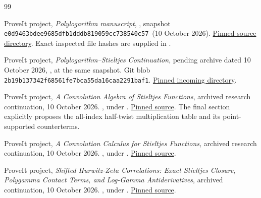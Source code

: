 \documentclass[11pt,letterpaper]{article}
\numberwithin{equation}{section}
\theoremstyle{plain}
\theoremstyle{definition}
\theoremstyle{remark}
\newcommand{\pinned}{\texttt{e0d9463bdee9685dfb1dddb819059cc738540c57}}
\begin{document}
\begin{thebibliography}{99}
\small\raggedright

ProveIt project,
\emph{Polylogarithm manuscript},
,
snapshot \pinned\ (10 October 2026).
\href{https://github.com/VladimirReshetnikov/ProveIt/tree/e0d9463bdee9685dfb1dddb819059cc738540c57/Analysis/Polylogarithms/docs/manuscript}{Pinned source directory}.
Exact inspected file hashes are supplied in .

ProveIt project,
\emph{Polylogarithm--Stieltjes Continuation},
pending archive dated 10 October 2026,
,
at the same snapshot.
Git blob \texttt{2b19b137342f68561fe7bca55da16caa2291baf1}.
\href{https://github.com/VladimirReshetnikov/ProveIt/tree/e0d9463bdee9685dfb1dddb819059cc738540c57/docs/incoming}{Pinned incoming directory}.

ProveIt project,
\emph{A Convolution Algebra of Stieltjes Functions},
archived research continuation, 10 October 2026.
,
under .
\href{https://github.com/VladimirReshetnikov/ProveIt/blob/e0d9463bdee9685dfb1dddb819059cc738540c57/Analysis/Polylogarithms/docs/reports/stieltjes-correlation-calculus/continuations/convolution-algebra/article.tex}{Pinned source}.
The final section explicitly proposes the all-index half-twist
multiplication table and its point-supported counterterms.

ProveIt project,
\emph{A Convolution Calculus for Stieltjes Functions},
archived research continuation, 10 October 2026.
,
under .
\href{https://github.com/VladimirReshetnikov/ProveIt/blob/e0d9463bdee9685dfb1dddb819059cc738540c57/Analysis/Polylogarithms/docs/reports/stieltjes-correlation-calculus/continuations/convolution-calculus/Stieltjes_Convolution_Calculus.tex}{Pinned source}.

ProveIt project,
\emph{Shifted Hurwitz-Zeta Correlations:
Exact Stieltjes Closure, Polygamma Contact Terms, and Log-Gamma Antiderivatives},
archived continuation, 10 October 2026.
,
under .
\href{https://github.com/VladimirReshetnikov/ProveIt/blob/e0d9463bdee9685dfb1dddb819059cc738540c57/Analysis/Polylogarithms/docs/reports/stieltjes-correlation-calculus/continuations/shifted-hurwitz-jets/sections.tex}{Pinned source}.


\end{thebibliography}
\end{document}
